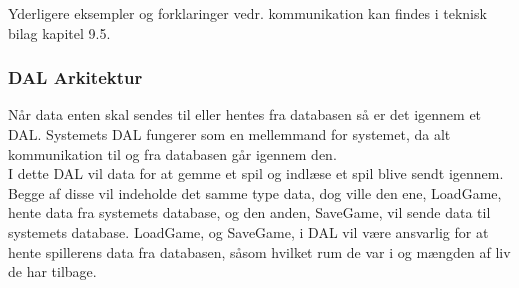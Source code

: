 Yderligere eksempler og forklaringer vedr. kommunikation kan findes i teknisk bilag kapitel 9.5.

\subsubsection{DAL Arkitektur}
Når data enten skal sendes til eller hentes fra databasen så er det igennem et DAL. Systemets DAL fungerer som en mellemmand for systemet, da alt kommunikation til og fra databasen går igennem den.\\
\noindent I dette DAL vil data for at gemme et spil og indlæse et spil blive sendt igennem. Begge af disse vil indeholde det samme type data, dog ville den ene, LoadGame, hente data fra systemets database, og den anden, SaveGame, vil sende data til systemets database. 
LoadGame, og SaveGame, i DAL vil være ansvarlig for at hente spillerens data fra databasen, såsom hvilket rum de var i og mængden af liv de har tilbage.
